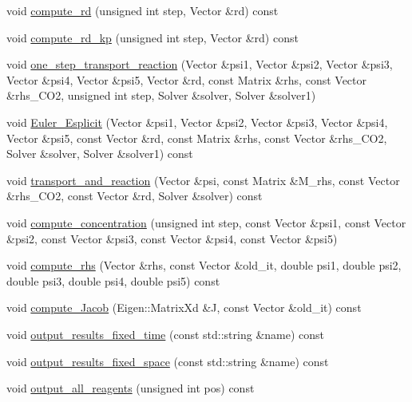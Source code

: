 \begin{DoxyCompactItemize}
void \hyperlink{classConcentration_a64980d7bc4cc7d90f4cf16496ed2db59}{compute\+\_\+rd} (unsigned int step, Vector \&rd) const
\item 
void \hyperlink{classConcentration_ae8ecace885fbce740b7b9a7708ffba89}{compute\+\_\+rd\+\_\+kp} (unsigned int step, Vector \&rd) const
\item 
void \hyperlink{classConcentration_a6ad7f6581bc6d2154584c97c247e75cf}{one\+\_\+step\+\_\+transport\+\_\+reaction} (Vector \&psi1, Vector \&psi2, Vector \&psi3, Vector \&psi4, Vector \&psi5, Vector \&rd, const Matrix \&rhs, const Vector \&rhs\+\_\+\+C\+O2, unsigned int step, Solver \&solver, Solver \&solver1)
\item 
void \hyperlink{classConcentration_abacfffb5a8ae37d8a360628633c4477d}{Euler\+\_\+\+Esplicit} (Vector \&psi1, Vector \&psi2, Vector \&psi3, Vector \&psi4, Vector \&psi5, const Vector \&rd, const Matrix \&rhs, const Vector \&rhs\+\_\+\+C\+O2, Solver \&solver, Solver \&solver1) const
\item 
void \hyperlink{classConcentration_a138eaad56f3cf6182dca4fe614b2e203}{transport\+\_\+and\+\_\+reaction} (Vector \&psi, const Matrix \&M\+\_\+rhs, const Vector \&rhs\+\_\+\+C\+O2, const Vector \&rd, Solver \&solver) const
\item 
void \hyperlink{classConcentration_a76d9c1ef7c4d3e37abe2ccef7851a856}{compute\+\_\+concentration} (unsigned int step, const Vector \&psi1, const Vector \&psi2, const Vector \&psi3, const Vector \&psi4, const Vector \&psi5)
\item 
void \hyperlink{classConcentration_a392671ef7d7f48fe9f55dc6e7a4365f4}{compute\+\_\+rhs} (Vector \&rhs, const Vector \&old\+\_\+it, double psi1, double psi2, double psi3, double psi4, double psi5) const
\item 
void \hyperlink{classConcentration_aac5f795f4721dc2cd15daaf9600fe24d}{compute\+\_\+\+Jacob} (Eigen\+::\+Matrix\+Xd \&J, const Vector \&old\+\_\+it) const
\item 
void \hyperlink{classConcentration_a3949ab18b97ffe8dfe1db0015c8f7541}{output\+\_\+results\+\_\+fixed\+\_\+time} (const std\+::string \&name) const
\item 
void \hyperlink{classConcentration_aa11eb4b7075f751ffa05e79bd917328f}{output\+\_\+results\+\_\+fixed\+\_\+space} (const std\+::string \&name) const
\item 
void \hyperlink{classConcentration_ab7a1370059ae7b9a5132d58df1f772eb}{output\+\_\+all\+\_\+reagents} (unsigned int pos) const
\end{DoxyCompactItemize}
